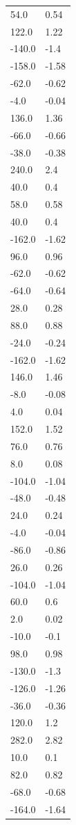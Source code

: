 \begin{longtable}{ll}
54.0 & 0.54 \\
122.0 & 1.22 \\
-140.0 & -1.4 \\
-158.0 & -1.58 \\
-62.0 & -0.62 \\
-4.0 & -0.04 \\
136.0 & 1.36 \\
-66.0 & -0.66 \\
-38.0 & -0.38 \\
240.0 & 2.4 \\
40.0 & 0.4 \\
58.0 & 0.58 \\
40.0 & 0.4 \\
-162.0 & -1.62 \\
96.0 & 0.96 \\
-62.0 & -0.62 \\
-64.0 & -0.64 \\
28.0 & 0.28 \\
88.0 & 0.88 \\
-24.0 & -0.24 \\
-162.0 & -1.62 \\
146.0 & 1.46 \\
-8.0 & -0.08 \\
4.0 & 0.04 \\
152.0 & 1.52 \\
76.0 & 0.76 \\
8.0 & 0.08 \\
-104.0 & -1.04 \\
-48.0 & -0.48 \\
24.0 & 0.24 \\
-4.0 & -0.04 \\
-86.0 & -0.86 \\
26.0 & 0.26 \\
-104.0 & -1.04 \\
60.0 & 0.6 \\
2.0 & 0.02 \\
-10.0 & -0.1 \\
98.0 & 0.98 \\
-130.0 & -1.3 \\
-126.0 & -1.26 \\
-36.0 & -0.36 \\
120.0 & 1.2 \\
282.0 & 2.82 \\
10.0 & 0.1 \\
82.0 & 0.82 \\
-68.0 & -0.68 \\
-164.0 & -1.64 \\

\end{longtable}
